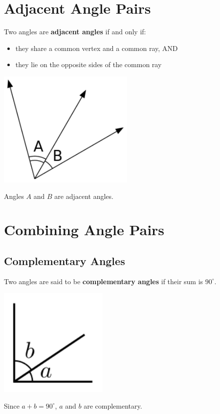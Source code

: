 \documentclass[12pt,a4paper]{article}
\begin{document}
\section{Adjacent Angle Pairs}
Two angles are {\bf adjacent angles} if and only if:
\begin{itemize}
    \item they share a common vertex and a common ray, AND
    \item they lie on the opposite sides of the common ray
\end{itemize}
\begin{center}
\includegraphics[width=0.5\textwidth]{adjacent.png}
\end{center}
Angles \(A\) and \(B\) are adjacent angles.

\newpage

\section{Combining Angle Pairs}
\subsection{Complementary Angles}
Two angles are said to be {\bf complementary angles} if their sum is \(90^\circ\).
\begin{center}
\includegraphics[width=0.4\textwidth]{complementary.png}
\end{center}
Since \(a+b=90^\circ\), \(a\) and \(b\) are complementary.
\end{document}
